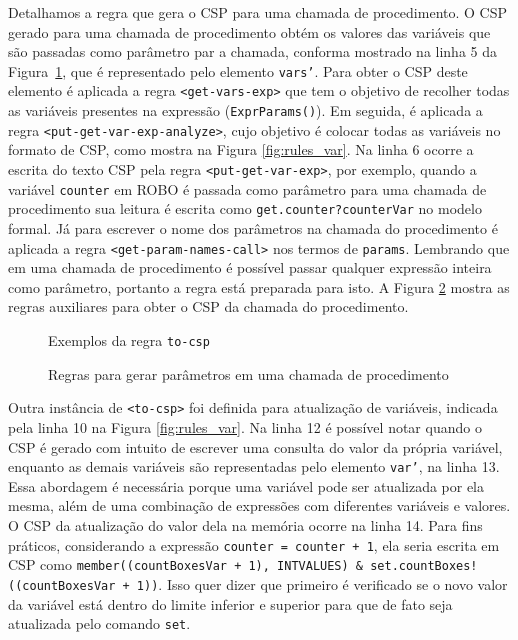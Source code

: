 Detalhamos a regra que gera o CSP para uma chamada de procedimento. O CSP gerado para uma chamada de procedimento 
obtém os valores das variáveis que são passadas como parâmetro par a chamada, conforma mostrado na linha 5 da Figura~\ref{fig:to_csp}, que é representado pelo elemento \texttt{vars'}. Para obter o CSP deste elemento é aplicada a regra \texttt{<get-vars-exp>} que tem o objetivo de recolher todas as variáveis presentes na expressão (\texttt{ExprParams()}). Em seguida, é aplicada a regra \texttt{<put-get-var-exp-analyze>}, cujo objetivo é colocar todas as variáveis no formato de CSP, como mostra na Figura \ref{fig:rules_var}. Na linha 6 ocorre a escrita do texto CSP pela regra \texttt{<put-get-var-exp>}, por exemplo, quando a variável \texttt{counter} em ROBO é passada como parâmetro para uma chamada de procedimento sua leitura é escrita como \texttt{get.counter?counterVar} no modelo formal. Já para escrever o nome dos parâmetros na chamada do procedimento é aplicada a regra  \texttt{<get-param-names-call>} nos termos de \texttt{params}. Lembrando que em uma chamada de procedimento é possível passar qualquer expressão inteira como parâmetro, portanto a regra está preparada para isto. A Figura \ref{fig:rules_param} mostra as regras auxiliares para obter o CSP da chamada do procedimento.

\begin{figure}[!h]
\centering
\caption{Exemplos da regra \texttt{to-csp}}

\label{fig:to_csp}
\end{figure}

\begin{figure}[!h]
\centering
\caption{Regras para gerar parâmetros em uma chamada de procedimento}

\label{fig:rules_param}
\end{figure}


Outra instância de \texttt{<to-csp>} foi definida para atualização de variáveis, indicada pela linha 10 na Figura \ref{fig:rules_var}. Na linha 12 é possível notar quando o CSP é gerado com intuito de escrever uma consulta do valor da própria variável, enquanto as demais variáveis são representadas pelo elemento \texttt{var'}, na linha 13. Essa abordagem é necessária porque uma variável pode ser atualizada por ela mesma, além de uma combinação de expressões com diferentes variáveis e valores. O CSP da atualização do valor dela na memória ocorre na linha 14. Para fins práticos, considerando a expressão \texttt{counter = counter + 1}, ela seria escrita em CSP como \texttt{member((countBoxesVar + 1), INTVALUES) \& set.countBoxes!((countBoxesVar + 1))}. Isso quer dizer que primeiro é verificado se o novo valor da variável está dentro do limite inferior e superior para que de fato seja atualizada pelo comando \texttt{set}.

